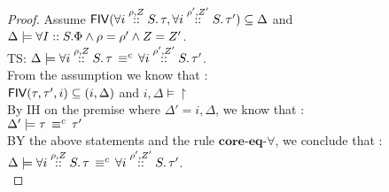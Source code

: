 \begin{proof}
    Assume $ \fiv{\tforall{\dmap}{\nnatA}{i} \type,\tforall{\dmap'}{\nnatA'}{i} \type'   } \subseteq \Delta $ and $\Delta \models \forall I::S.\restriction
    \land \dmap = \dmap' \land \nnatA = \nnatA'  $.\\
  TS: $\Delta \models \eqvc{ \tforall{\dmap}{\nnatA}{i} \type }{ \tforall{\dmap'}{\nnatA'}{i} \type' } $.\\
  From the assumption we know that :\\
 $ \fiv{\type, \type',i} \subseteq (i,\Delta) $ and $  i,\Delta \models \restriction   $\\
 
 
   By IH on the premise where $\Delta' = i, \Delta$, we know that : \\
 $\Delta' \models \eqvc{\type}{\type'}$ \\ 
 BY the above statements and the rule $\textbf{core-eq-$\forall$}$, we conclude that : \\
  $\Delta \models \eqvc{ \tforall{\dmap}{\nnatA}{i} \type }{ \tforall{\dmap'}{\nnatA'}{i} \type' } $.\\
    
\end{proof}


